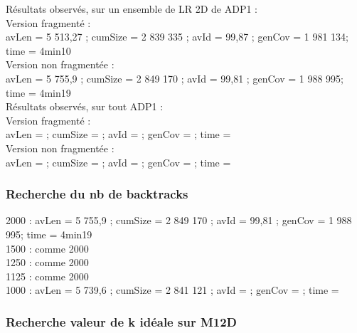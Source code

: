 \documentclass[12pt]{article}
\begin{document}
\newpage

Résultats observés, sur un ensemble de LR 2D de ADP1 : \\

Version fragmenté : \\

avLen = 5 513,27 ; cumSize = 2 839 335 ; avId = 99,87 ; genCov = 1 981 134; time = 4min10 \\

Version non fragmentée : \\

avLen = 5 755,9 ; cumSize = 2 849 170 ; avId = 99,81 ; genCov = 1 988 995; time = 4min19 \\

Résultats observés, sur tout ADP1 : \\

Version fragmenté : \\

avLen =  ; cumSize =  ; avId =  ; genCov = ; time =  \\

Version non fragmentée : \\

avLen =  ; cumSize =  ; avId =  ; genCov =  ; time = \\

\subsubsection{Recherche du nb de backtracks}

2000 : avLen = 5 755,9 ; cumSize = 2 849 170 ; avId = 99,81 ; genCov = 1 988 995; time = 4min19 \\

1500 : comme 2000 \\

1250 : comme 2000 \\

1125 : comme 2000 \\

1000 : avLen = 5 739,6 ; cumSize = 2 841 121 ; avId =  ; genCov =  ; time = \\

\subsubsection{Recherche valeur de k idéale sur M12D}
\end{document}
